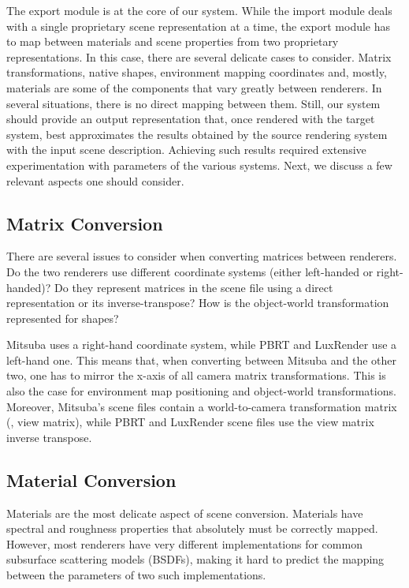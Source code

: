 The export module is at the core of our system. While the import module deals with a single proprietary scene representation at a time, the export module has to map between materials and scene properties from two proprietary representations. In this case, there are several delicate cases to consider. Matrix transformations, native shapes, environment mapping coordinates and, mostly, materials are some of the components that vary greatly between renderers. In several situations, there is no direct mapping between them. Still, our system should provide an output representation that, once rendered with the target system, best approximates the results obtained by the source rendering system with the input scene description. Achieving such results required extensive experimentation with parameters of the various systems. Next, we discuss a few relevant aspects one should consider.    

  
\subsection{Matrix Conversion}
There are several issues to consider when converting matrices between renderers. Do the two renderers use different coordinate systems (either left-handed or right-handed)? Do they represent matrices in the scene file using a direct representation or its inverse-transpose? How is the object-world transformation represented for shapes?

Mitsuba uses a right-hand coordinate system, while PBRT and LuxRender use a left-hand one. This means that, when converting between Mitsuba and the other two, one has to mirror the x-axis of all camera matrix transformations. This is also the case for environment map positioning and object-world transformations. Moreover, Mitsuba's scene files contain a world-to-camera transformation matrix (\ie, view matrix), while PBRT and LuxRender scene files use the view matrix inverse transpose.

\subsection{Material Conversion}
Materials are the most delicate aspect of scene conversion. Materials have spectral and roughness properties that absolutely must be correctly mapped. However, most renderers have very different implementations for common subsurface scattering models (BSDFs), making it hard to predict the mapping between the parameters of two such implementations.

